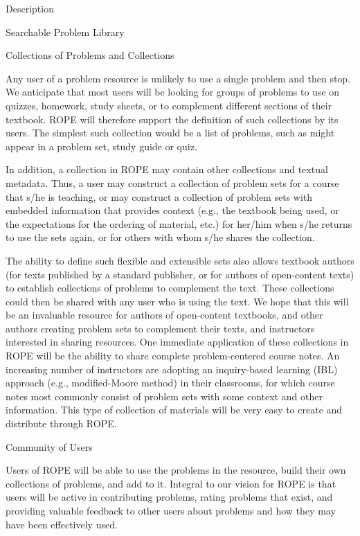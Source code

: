 \documentclass[11pt]{article}
\begin{document}
\begin{section}{Description}
\begin{subsection}{Searchable Problem Library}
\end{subsection}

\begin{subsection}{Collections of Problems and Collections}

Any user of a problem resource is unlikely to use a single problem and
then stop.  We anticipate that most users will be looking for groups of
problems to use on quizzes, homework, study sheets, or to complement
different sections of their textbook.  ROPE will therefore support the
definition of such collections by its users.  The simplest such collection
would be a list of problems, such as might appear in a problem set, study
guide or quiz.

In addition, a collection in ROPE may contain other collections and
textual metadata.  Thus, a user may construct a collection of problem sets
for a course that s/he is teaching, or may construct a collection of
problem sets with embedded information that provides context (e.g., the
textbook being used, or the expectations for the ordering of material,
etc.) for her/him when s/he returns to use the sets again, or for others
with whom s/he shares the collection.

The ability to define such flexible and extensible sets also allows 
textbook authors (for texts published by a standard publisher, or for
authors of open-content texts) to establish collections of problems to
complement the text.  These collections could then be shared with any user 
who is using the text.  We hope that this will be an invaluable resource
for authors of open-content textbooks, and other authors creating problem
sets to complement their texts, and instructors interested in sharing
resources.  One immediate application of these collections in ROPE will be the
ability to share complete problem-centered course notes.  An increasing
number of instructors are adopting an inquiry-based learning (IBL) approach (e.g., modified-Moore method) in their
classrooms, for which course notes most commonly consist of problem sets
with some context and other information.  This type of collection of
materials will be very easy to create and distribute through ROPE.

\end{subsection}

\begin{subsection}{Community of Users}

Users of ROPE will be able to use the problems in the resource, build
their own collections of problems, and add to it.  Integral to our vision
for ROPE is that users will be active in contributing problems, rating
problems that exist, and providing valuable feedback to other users about
problems and how they may have been effectively used.


\end{subsection}
\end{section}
\end{document}

